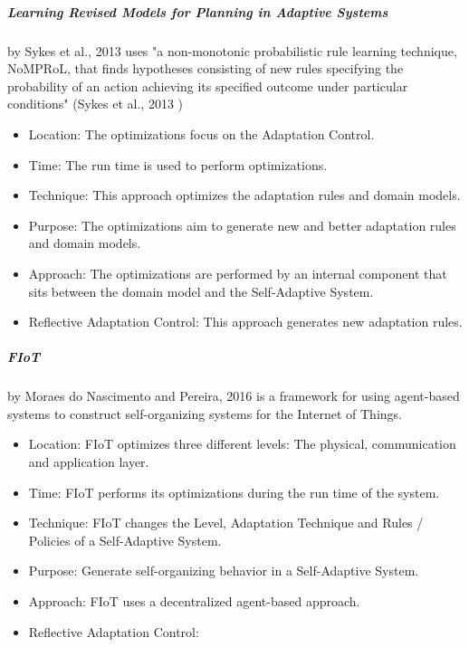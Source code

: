 \subparagraph*{Learning Revised Models for Planning in Adaptive Systems}
by Sykes et al., 2013 \cite*{LearningRevisedModels} uses
"a non-monotonic
probabilistic rule learning technique, NoMPRoL, that finds
hypotheses consisting of new rules specifying the probability
of an action achieving its specified outcome under particular
conditions" (Sykes et al., 2013 \cite*{LearningRevisedModels})
\begin{itemize}[nosep]
    \item Location: The optimizations focus on the Adaptation Control.
    \item Time: The run time is used to perform optimizations.
    \item Technique: This approach optimizes the adaptation rules and domain models.
    \item Purpose: The optimizations aim to generate new and better adaptation rules and domain models.
    \item Approach: The optimizations are performed by an internal component that sits between the domain model
    and the Self-Adaptive System.
    \item Reflective Adaptation Control: This approach generates new adaptation rules.
\end{itemize}

\subparagraph*{FIoT}
by Moraes do Nascimento and Pereira, 2016 \cite*{FIoT} is a framework for using agent-based systems
to construct self-organizing systems for the Internet of Things.
\begin{itemize}[nosep]
    \item Location: FIoT optimizes three different levels: The physical, communication and application layer.
    \item Time: FIoT performs its optimizations during the run time of the system.
    \item Technique: FIoT changes the Level, Adaptation Technique and Rules / Policies of a Self-Adaptive System.
    \item Purpose: Generate self-organizing behavior in a Self-Adaptive System.
    \item Approach: FIoT uses a decentralized agent-based approach.
    \item Reflective Adaptation Control: %
\end{itemize}